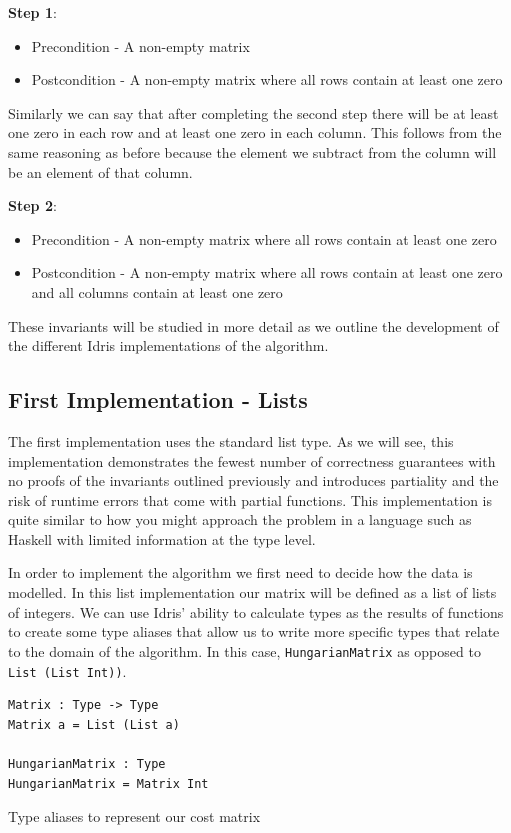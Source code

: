 \documentclass[a4paper, notitlepage]{report}
\begin{document}
\textbf{Step 1}:
\begin{itemize}
\item Precondition - A non-empty matrix
\item Postcondition - A non-empty matrix where all rows contain at least one zero
\end{itemize}

Similarly we can say that after completing the second step there will be at
least one zero in each row and at least one zero in each column. This follows
from the same reasoning as before because the element we subtract from the
column will be an element of that column.

\textbf{Step 2}:
\begin{itemize}
\item Precondition - A non-empty matrix where all rows contain at least one zero
\item Postcondition - A non-empty matrix where all rows contain at least one zero
and all columns contain at least one zero
\end{itemize}

These invariants will be studied in more detail as we outline the development of
the different Idris implementations of the algorithm.

\subsection{First Implementation - Lists}
\label{sec:org44c6569}
The first implementation uses the standard list type. As we will see, this
implementation demonstrates the fewest number of correctness guarantees with no
proofs of the invariants outlined previously and introduces partiality and the
risk of runtime errors that come with partial functions. This implementation is
quite similar to how you might approach the problem in a language such as
Haskell with limited information at the type level.

In order to implement the algorithm we first need to decide how the data is
modelled. In this list implementation our matrix will be defined as a list of
lists of integers. We can use Idris' ability to calculate types as the results
of functions to create some type aliases that allow us to write more specific
types that relate to the domain of the algorithm. In this case, \texttt{HungarianMatrix}
as opposed to \texttt{List (List Int))}.

\begin{listing}[H]
\begin{verbatim}
Matrix : Type -> Type
Matrix a = List (List a)

HungarianMatrix : Type
HungarianMatrix = Matrix Int
\end{verbatim}
\caption{Type aliases to represent our cost matrix}
\end{listing}
\end{document}
